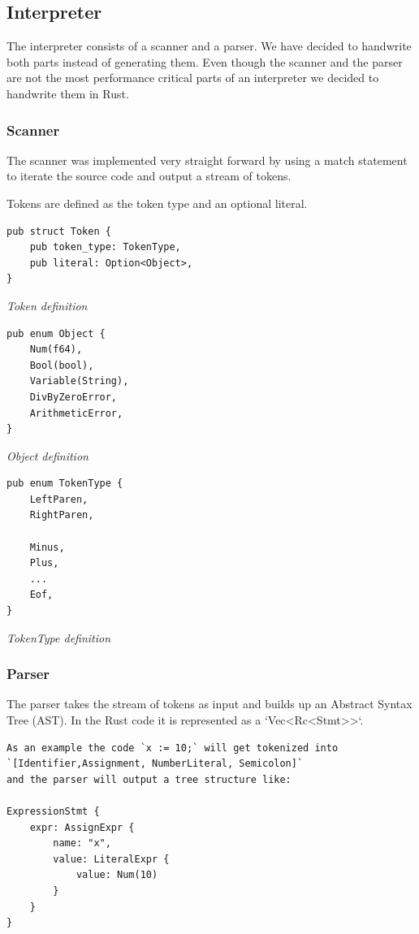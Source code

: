 \documentclass{article}
\begin{document}
\subsection{Interpreter}
The interpreter consists of a scanner and a parser. We have decided to
handwrite both parts instead of generating them. Even though the scanner and
the parser are not the most performance critical parts of an interpreter we
decided to handwrite them in Rust.

\subsubsection{Scanner}
The scanner was implemented very straight forward by using a match statement 
to iterate the source code and output a stream of tokens.

Tokens are defined as the token type and an optional literal.

\begin{verbatim}
pub struct Token {
    pub token_type: TokenType,
    pub literal: Option<Object>,
}
\end{verbatim}
\textit{Token definition}

\begin{verbatim}
pub enum Object {
    Num(f64),
    Bool(bool),
    Variable(String),
    DivByZeroError,
    ArithmeticError,
}
\end{verbatim}
\textit{Object definition}

\begin{verbatim}
pub enum TokenType {
    LeftParen,
    RightParen,

    Minus,
    Plus,
    ...
    Eof,
}
\end{verbatim}
\textit{TokenType definition}

\subsubsection{Parser}
The parser takes the stream of tokens as input and builds up an Abstract Syntax
Tree (AST). In the Rust code it is represented as a `Vec<Rc<Stmt>>`.

\begin{verbatim}
As an example the code `x := 10;` will get tokenized into 
`[Identifier,Assignment, NumberLiteral, Semicolon]` 
and the parser will output a tree structure like:

ExpressionStmt {
    expr: AssignExpr {
        name: "x",
        value: LiteralExpr {
            value: Num(10)
        }
    }
}
\end{verbatim}
\end{document}
